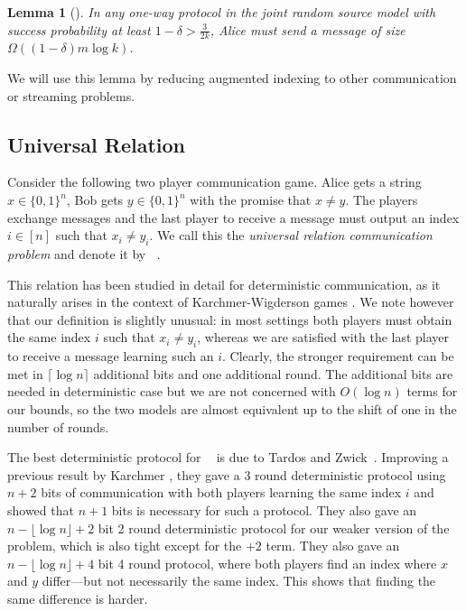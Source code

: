 \documentclass[9pt,letterpaper]{article}
\newtheorem{lemma}{Lemma}
\theoremstyle{remark}
\DeclareMathOperator{\URn}{UR^n}
\begin{document}
\begin{lemma}[\cite{MiltersenNSW}]\label{lem:ai}
In any one-way protocol in the joint random source model with success
probability at least $1-\delta>\frac{3}{2k}$, Alice must send a message of
size $\Omega((1-\delta)m\log k)$.
\end{lemma}

We will use this lemma by reducing augmented indexing to other communication
or streaming problems.

%
%
\subsection{Universal Relation}\label{sec:ur}
Consider the following two player communication game.
Alice gets a string $x\in\{0,1\}^n$, Bob gets $y\in\{0,1\}^n$ with
  the promise that $x\neq y$. The players exchange 
  messages and the last player to receive a message must
   output an index $i\in [n]$ such that $x_i\neq y_i$. 
  We call this the {\em universal relation communication problem} and denote it by $\URn$.

This relation has been studied in detail for deterministic communication, as 
it naturally arises in the context of
 Karchmer-Wigderson games \cite{KarchmerWigderson}. We note however
 that our definition is slightly unusual: in most settings both players must
 obtain the same index $i$ such that $x_i\neq y_i$, whereas we are satisfied
 with the last player to receive a message learning such an $i$. Clearly, the
 stronger requirement can be met in $\lceil\log n\rceil$ additional bits and
 one additional round. The additional bits are needed in deterministic case
 but we are not concerned with $O(\log n)$ terms for our bounds, so the two
 models are almost equivalent up to the shift of one in the number of rounds.

The best deterministic protocol for $\URn$ is due to 
 Tardos and Zwick~\cite{TardosZwick}. Improving a previous result 
 by Karchmer \cite{Karchmer}, they gave a 3 round deterministic protocol 
 using $n+2$ bits of communication with both players learning the same index
 $i$ and showed that $n+1$ bits is necessary for such a protocol. They also
 gave an $n-\lfloor\log n\rfloor+2$ bit 2 round deterministic protocol for our
 weaker version of the problem, which is also tight except for the $+2$
 term. They also gave an $n-\lfloor\log n\rfloor+4$ bit 4 round protocol, where
 both players find an index where $x$ and $y$ differ---but not necessarily
 the same index. This shows that finding the same difference is harder.
\end{document}
